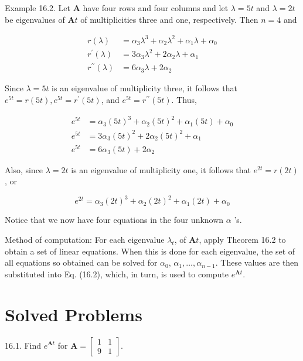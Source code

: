 \documentclass[10pt]{article}
\begin{document}
Example 16.2. Let $\mathbf{A}$ have four rows and four columns and let $\lambda=5 t$ and $\lambda=2 t$ be eigenvalues of $\mathbf{A} t$ of multiplicities three and one, respectively. Then $n=4$ and

$$
\begin{aligned}
r(\lambda) & =\alpha_{3} \lambda^{3}+\alpha_{2} \lambda^{2}+\alpha_{1} \lambda+\alpha_{0} \\
r^{\prime}(\lambda) & =3 \alpha_{3} \lambda^{2}+2 \alpha_{2} \lambda+\alpha_{1} \\
r^{\prime \prime}(\lambda) & =6 \alpha_{3} \lambda+2 \alpha_{2}
\end{aligned}
$$

Since $\lambda=5 t$ is an eigenvalue of multiplicity three, it follows that $e^{5 t}=r(5 t), e^{5 t}=r^{\prime}(5 t)$, and $e^{5 t}=r^{\prime \prime}(5 t)$. Thus,

$$
\begin{aligned}
e^{5 t} & =\alpha_{3}(5 t)^{3}+\alpha_{2}(5 t)^{2}+\alpha_{1}(5 t)+\alpha_{0} \\
e^{5 t} & =3 \alpha_{3}(5 t)^{2}+2 \alpha_{2}(5 t)^{2}+\alpha_{1} \\
e^{5 t} & =6 \alpha_{3}(5 t)+2 \alpha_{2}
\end{aligned}
$$

Also, since $\lambda=2 t$ is an eigenvalue of multiplicity one, it follows that $e^{2 t}=r(2 t)$, or

$$
e^{2 t}=\alpha_{3}(2 t)^{3}+\alpha_{2}(2 t)^{2}+\alpha_{1}(2 t)+\alpha_{0}
$$

Notice that we now have four equations in the four unknown $\alpha$ 's.

Method of computation: For each eigenvalue $\lambda_{t}$, of $\mathbf{A} t$, apply Theorem 16.2 to obtain a set of linear equations. When this is done for each eigenvalue, the set of all equations so obtained can be solved for $\alpha_{0}$, $\alpha_{1}, \ldots, \alpha_{n-1}$. These values are then substituted into Eq. (16.2), which, in turn, is used to compute $e^{\mathbf{A} t}$.

\section*{Solved Problems}
16.1. Find $e^{\mathbf{A} t}$ for $\mathbf{A}=\left[\begin{array}{ll}1 & 1 \\ 9 & 1\end{array}\right]$.
\end{document}
